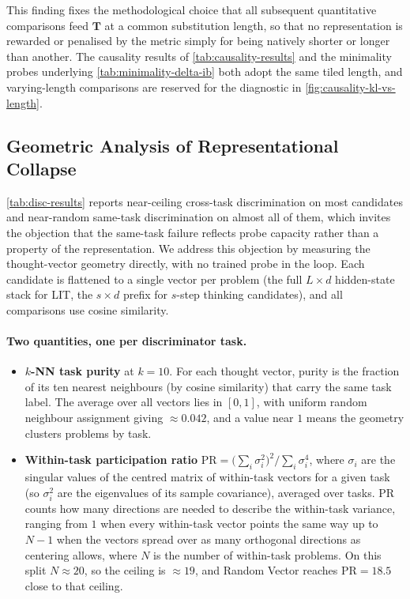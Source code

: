 This finding fixes the methodological choice that all subsequent quantitative comparisons feed $\mathbf{T}$ at a common substitution length, so that no representation is rewarded or penalised by the metric simply for being natively shorter or longer than another. The causality results of \cref{tab:causality-results} and the minimality probes underlying \cref{tab:minimality-delta-ib} both adopt the same tiled length, and varying-length comparisons are reserved for the diagnostic in \cref{fig:causality-kl-vs-length}.



\subsection{Geometric Analysis of Representational Collapse}
\label{appendix:geometric}

\cref{tab:disc-results} reports near-ceiling cross-task discrimination on most candidates and near-random same-task discrimination on almost all of them, which invites the objection that the same-task failure reflects probe capacity rather than a property of the representation. We address this objection by measuring the thought-vector geometry directly, with no trained probe in the loop. Each candidate is flattened to a single vector per problem (the full $L{\times}d$ hidden-state stack for LIT, the $s{\times}d$ prefix for $s$-step thinking candidates), and all comparisons use cosine similarity.

\paragraph{Two quantities, one per discriminator task.}
\begin{itemize}[leftmargin=1.6em,itemsep=3pt,topsep=2pt]
  \item \textbf{$k$-NN task purity} \citep{wu2018unsupervised, caron2021emerging} at $k{=}10$. For each thought vector, purity is the fraction of its ten nearest neighbours (by cosine similarity) that carry the same task label. The average over all vectors lies in $[0, 1]$, with uniform random neighbour assignment giving $\approx 0.042$, and a value near $1$ means the geometry clusters problems by task.
  \item \textbf{Within-task participation ratio} \citep{litwinkumar2017optimal, recanatesi2019dimensionality} $\mathrm{PR} = \bigl(\sum_i \sigma_i^2\bigr)^2 / \sum_i \sigma_i^4$, where $\sigma_i$ are the singular values of the centred matrix of within-task vectors for a given task (so $\sigma_i^2$ are the eigenvalues of its sample covariance), averaged over tasks. $\mathrm{PR}$ counts how many directions are needed to describe the within-task variance, ranging from $1$ when every within-task vector points the same way up to $N{-}1$ when the vectors spread over as many orthogonal directions as centering allows, where $N$ is the number of within-task problems. On this split $N \approx 20$, so the ceiling is $\approx 19$, and Random Vector reaches $\mathrm{PR} = 18.5$ close to that ceiling.
\end{itemize}

